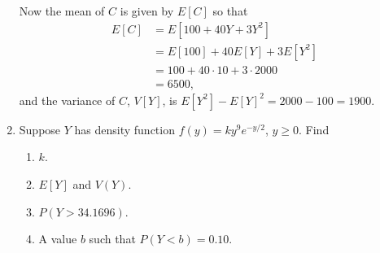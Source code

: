 \documentclass[9pt]{article}
\begin{document}
\begin{enumerate}
      Now the mean of $C$ is given by $E[C]$ so that
      \begin{align*}
         E[C] &= E[100 + 40Y + 3Y^2] \\
            &= E[100] + 40E[Y] + 3E[Y^2] \\
            &= 100 + 40 \cdot 10 + 3 \cdot 2000 \\
            &= 6500,
      \end{align*}
      and the variance of $C$, $V[Y]$, is
      $E[Y^2] - E[Y]^2 = 2000 - 100 = 1900$.
   \item Suppose $Y$ has density function $f(y) = ky^9e^{-y/2}$, $y \ge 0$.
         Find
         \begin{enumerate}
            \item $k$.
            \item $E[Y]$ and $V(Y)$.
            \item $P(Y > 34.1696)$.
            \item A value $b$ such that $P(Y < b) = 0.10$.
         \end{enumerate}


\end{enumerate}
\end{document}
